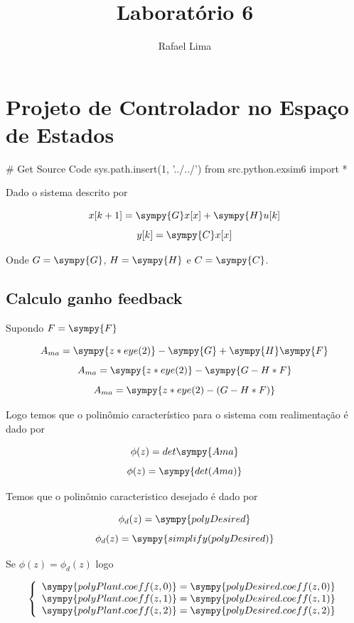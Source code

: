 \documentclass[a4paper,11pt]{article}
\title{Laboratório 6} %
\author{Rafael Lima}
\begin{document}

\section{Projeto de Controlador no Espaço de Estados}

\begin{sympycode}
# Get Source Code
sys.path.insert(1, '../../')
from src.python.exsim6 import *
\end{sympycode}

Dado o sistema descrito por

$$ x[k+1] = \sympy{G} x[x] + \sympy{H} u[k] $$
$$ y[k] = \sympy{C} x[x] $$

Onde $G=\sympy{G}$, $H=\sympy{H}$ e $C=\sympy{C}$.

\subsection{Calculo ganho feedback}

Supondo $F = \sympy{F}$

$$A_{ma} = \sympy{z*eye(2)} - \sympy{G} + \sympy{H}\sympy{F}$$
$$A_{ma} = \sympy{z*eye(2)} - \sympy{G -H*F}$$
$$A_{ma} = \sympy{z*eye(2) - (G -H*F)}$$

Logo temos que o polinômio característico para o sistema com realimentação é dado por 

$$\phi(z) = det\sympy{Ama}$$
$$\phi(z) = \sympy{det(Ama)}$$

Temos que o polinômio caracteristico desejado é dado por

$$\phi_d(z) = \sympy{polyDesired}$$
$$\phi_d(z) = \sympy{simplify(polyDesired)}$$

Se $\phi(z) = \phi_d(z)$ logo

$$
\left\{
    \begin{array}{l}
        \sympy{polyPlant.coeff(z,0)} = \sympy{polyDesired.coeff(z,0)}\\
        \sympy{polyPlant.coeff(z,1)} = \sympy{polyDesired.coeff(z,1)}\\
        \sympy{polyPlant.coeff(z,2)} = \sympy{polyDesired.coeff(z,2)}\\
    \end{array}
\right.
$$
\end{document}
